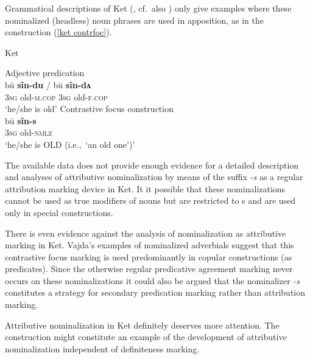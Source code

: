 Grammatical descriptions of Ket (\citealt{vajda2004}, cf.~also \citealt{krukova2007}) only give examples where these nominalized (headless) noun phrases are used in apposition, as in the  construction (\ref{ket contrfoc}). 
\begin{exe}
\ex 
\label{ket contrfoc}
\rm{Ket \citep{vajda2005}} 
\begin{xlist}
\ex	
\rm{Adjective predication}\\
\gll	bū \textbf{sîn-du} / bū \textbf{sîn-dʌ}\\
	3\textsc{sg} old-\textsc{m.cop} { } 3\textsc{sg} old-\textsc{f.cop}\\
\glt	‘he/she is old’
\ex	
\rm{Contrastive focus construction}\\
\gll	bū \textbf{sîn-s}\\
	3\textsc{sg} old-\textsc{nmlz}\\
\glt	‘he/she is OLD (i.e.,~‘an old one’)’
\end{xlist}
\end{exe}
The available data does not provide enough evidence for a detailed description and analyses of attributive nominalization by means of the suffix \textit{-s} as a regular attribution marking device in Ket. It it possible that these nominalizations cannot be used as true modifiers of nouns but are restricted to s and are used only in special  constructions.

There is even evidence against the analysis of nominalization as attributive marking in Ket. Vajda's examples of nominalized adverbials suggest that this contrastive focus marking is used predominantly in copular constructions (as predicates). Since the otherwise regular predicative agreement marking never occurs on these nominalizations \cite[15]{vajda2004} it could also be argued that the nominalizer \textit{-s} constitutes a strategy for secondary predication marking rather than attribution marking.

Attributive nominalization in Ket definitely deserves more attention. The construction might constitute an example of the development of attributive nominalization independent of definiteness marking.

